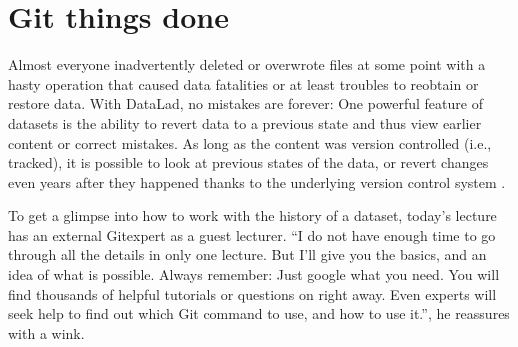 \chapter{Git things done}
\label{\detokenize{basics/101-137-history:git-things-done}}\label{\detokenize{basics/101-137-history:history}}\label{\detokenize{basics/101-137-history::doc}}

\sphinxAtStartPar
Almost everyone inadvertently deleted or overwrote files at some point with
a hasty operation that caused data fatalities or at least troubles to
reobtain or restore data.
With DataLad, no mistakes are forever: One powerful feature of datasets
is the ability to revert data to a previous state and thus view earlier content or
correct mistakes. As long as the content was version controlled (i.e., tracked),
it is possible to look at previous states of the data, or revert changes \textendash{}
even years after they happened \textendash{} thanks to the underlying version control
system {\hyperref[\detokenize{glossary:term-Git}]{}}.

\sphinxAtStartPar
To get a glimpse into how to work with the history of a dataset, today’s lecture
has an external Git\sphinxhyphen{}expert as a guest lecturer.
“I do not have enough time to go through all the details in only
one lecture. But I’ll give you the basics, and an idea of what is possible.
Always remember: Just google what you need. You will find thousands of helpful tutorials
or questions on  right away.
Even experts will  seek help to find out which Git command to
use, and how to use it.”, he reassures with a wink.

